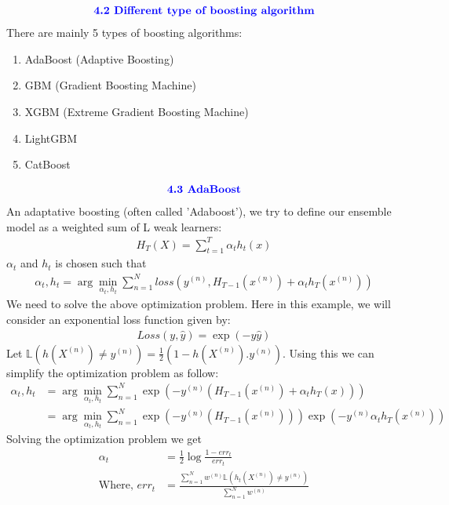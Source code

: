 \documentclass{homework}
\begin{document}
\begin{align*}
    \textcolor{blue}{ \text{{\textbf{4.2 Different type of boosting algorithm}}}}
 \end{align*}
There are mainly 5 types of boosting algorithms:
\begin{enumerate}
    \item AdaBoost (Adaptive Boosting)
    \item GBM (Gradient Boosting Machine)
    \item XGBM (Extreme Gradient Boosting Machine)
    \item LightGBM
    \item CatBoost
\end{enumerate}

\begin{align*}
    \textcolor{blue}{ \text{{\textbf{4.3 AdaBoost}}}}
 \end{align*}
 An adaptative boosting (often called 'Adaboost'), we try to define our ensemble model as a weighted sum of L weak learners: 
 \begin{align*}
    H_T(X) = \sum_{t=1}^{T}\alpha_t h_t(x)
 \end{align*}
 $\alpha_t$ and $h_t$ is chosen such that 
 \begin{align*}
    \alpha_t,h_t = \arg \min_{\alpha_t,h_t} \sum_{n=1}^{N} loss(y^{(n)},H_{T-1}(x^{(n)}) + \alpha_t h_T(x^{(n)}))
 \end{align*}
 We need to solve the above optimization problem. Here in this example, we will consider an exponential loss function given by:
 \begin{align*}
    Loss(y,\hat{y}) = \exp(-y\hat{y})
 \end{align*}
 Let $\mathbb{L}(h(X^{(n)}) \neq y^{(n)}) = \frac{1}{2}(1 - h(X^{(n)}).y^{(n)})$. Using this we can simplify the optimization problem as follow:
 \begin{align*}
    \alpha_t,h_t &= \arg \min_{\alpha_t,h_t} \sum_{n=1}^{N} \exp(-y^{(n)}(H_{T-1}(x^{(n)}) + \alpha_t h_T(x))) \\
    &= \arg \min_{\alpha_t,h_t} \sum_{n=1}^{N} \exp(-y^{(n)}(H_{T-1}(x^{(n)}))) \exp(-y^{(n)}\alpha_t h_T(x^{(n)}))
 \end{align*}
 Solving the optimization problem we get 
 \begin{align*}
    \alpha_t &= \frac{1}{2} \log \frac{1 - err_t}{err_t} \\
    \text{Where, } err_t &= \frac{\sum_{n=1}^{N}w^{(n)}\mathbb{L}(h_t(X^{(n)}) \neq y^{(n)})}{\sum_{n=1}^{N}w^{(n)}} \\
 \end{align*}
\end{document}
